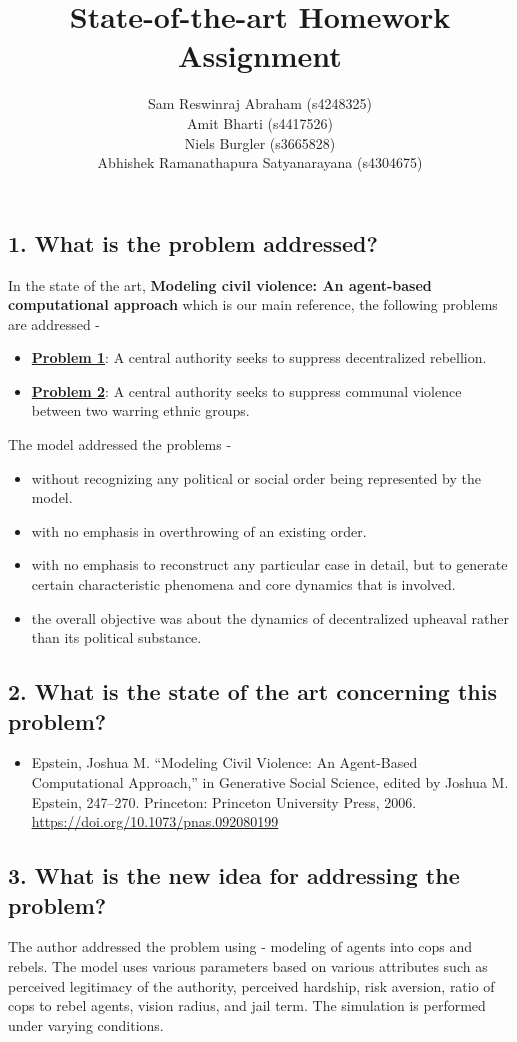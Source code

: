 \documentclass[a4paper,11pt]{article}
\title{State-of-the-art Homework Assignment}
\author{
  Sam Reswinraj Abraham (s4248325)
  \\
  Amit Bharti (s4417526)
  \\
  Niels Burgler (s3665828)
  \\
  Abhishek Ramanathapura Satyanarayana (s4304675)
}
\begin{document}
\maketitle

\subsection*{1. What is the problem addressed?}
    In the state of the art, \textbf{Modeling civil violence: An agent-based computational approach} which is our main reference, the following problems are addressed - 
    \begin{itemize}
        \item\underline{\textbf{Problem 1}}: A central authority seeks to suppress decentralized rebellion.
        \item\underline{\textbf{Problem 2}}: A central authority seeks to suppress communal violence between two warring ethnic groups.
    \end{itemize}
    The model addressed the problems -
    \begin{itemize}
        \item without recognizing any political or social order being represented by the model.
        \item with no emphasis in overthrowing of an existing order. 
        \item with no emphasis to reconstruct any particular case in detail, but to generate certain characteristic phenomena and core dynamics that is involved.
        \item the overall objective was about the dynamics of decentralized upheaval rather than its political substance.
    \end{itemize}


\subsection*{2. What is the state of the art concerning this problem?}
    \begin{itemize}
        \item Epstein, Joshua M. “Modeling Civil Violence: An Agent-Based Computational Approach,” in Generative Social Science, edited by Joshua M. Epstein, 247–270. Princeton: Princeton University Press, 2006. \underline{\url{https://doi.org/10.1073/pnas.092080199}}
    \end{itemize}


\subsection*{3. What is the new idea for addressing the problem?}
    The author addressed the problem using - modeling of agents into cops and rebels. The model uses various parameters based on various attributes such as perceived legitimacy of the authority, perceived hardship, risk aversion, ratio of cops to rebel agents, vision radius, and jail term. The simulation is performed under varying conditions.
\end{document}
